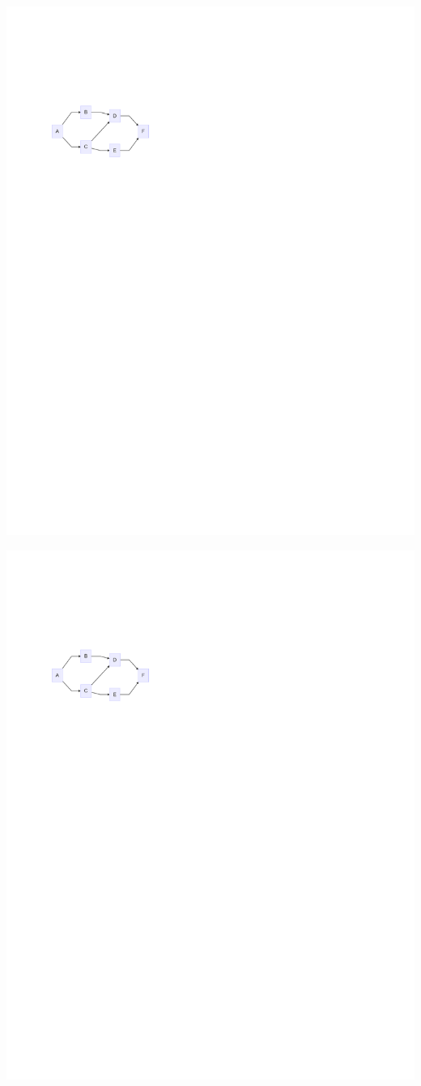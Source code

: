 \documentclass[
  letterpaper,
]{scrbook}
\begin{document}
\includegraphics{./summary_files/figure-pdf/unnamed-chunk-1-1.pdf}

\includegraphics{./summary_files/figure-pdf/unnamed-chunk-2-1.pdf}
\end{document}
